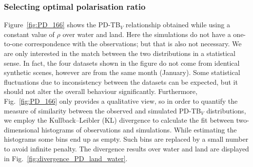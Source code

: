 \documentclass[amt, manuscript]{copernicus}
\begin{document}
\subsubsection{Selecting optimal polarisation ratio}
%
Figure~\ref{fig:PD_166} shows the PD-TB$_V$ relationship obtained while using a constant value of $\rho$ over water and land. Here the simulations do not have a one-to-one correspondence with the observations; but that is also not necessary. We are only interested in the match between the two distributions in a statistical sense. In fact, the four datasets shown in the figure do not come from identical synthetic scenes, however are from the same month (January). Some statistical fluctuations due to inconsistency between the datasets can be expected, but it should not alter the overall behaviour significantly. Furthermore, Fig.~\ref{fig:PD_166} only provides a qualitative view, so in order to quantify the measure of similarity between the observed and simulated PD-TB$_V$ distributions, we employ the Kullback–Leibler (KL) divergence \citep{Joyce:kl:11} to calculate the fit between two-dimensional histograms of observations and simulations. While estimating the histograms some bins end up as empty. Such bins are replaced by a small number to avoid infinite penalty. The divergence results over water and land are displayed in Fig.~\ref{fig:divergence_PD_land_water}.
\end{document}
